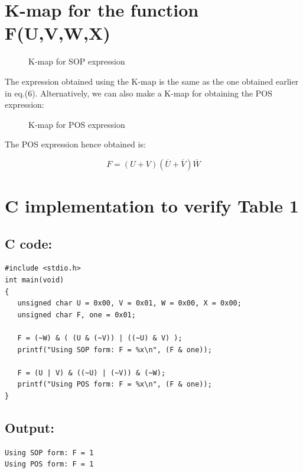 \documentclass{article}
\begin{document}
\section{K-map for the function F(U,V,W,X)}
\hspace{2cm}
\begin{figure}[h]
\centering

\caption{K-map for SOP expression}
\label{kmap_SOP}
\end{figure}

The expression obtained using the K-map is the same as the one obtained earlier in eq.(6). Alternatively, we can also make a K-map for obtaining the POS expression:

\begin{figure}[h]
\centering

\caption{K-map for POS expression}
\label{kmap_POS}
\end{figure}

The POS expression hence obtained is:

\begin{equation}
    F = (U+V)(\overline{U}+\overline{V})\overline{W}
\end{equation}

\section{C implementation to verify Table 1}
\subsection{C code:}
\begin{lstlisting}[style=CStyle]
#include <stdio.h>
int main(void)
{
   unsigned char U = 0x00, V = 0x01, W = 0x00, X = 0x00;
   unsigned char F, one = 0x01;
   
   F = (~W) & ( (U & (~V)) | ((~U) & V) );
   printf("Using SOP form: F = %x\n", (F & one));
   
   F = (U | V) & ((~U) | (~V)) & (~W);
   printf("Using POS form: F = %x\n", (F & one));
}
\end{lstlisting}
\subsection{Output:}
\begin{lstlisting}[style=CStyle]
Using SOP form: F = 1
Using POS form: F = 1
\end{lstlisting}

\hline
\end{document}
